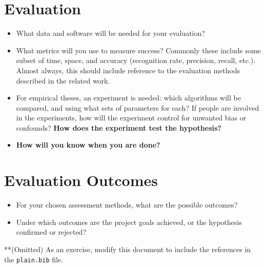 \documentclass[11pt]{artikel3}
\begin{document}
\section{Evaluation}







\begin{itemize}
\item What data and software will be needed for your evaluation? 
\item What metrics
will you use to measure success? Commonly these include some subset of time, space, and accuracy (recognition rate, precision, recall, etc.).
Almost always, this should include reference to the evaluation methods described in the related work.
\item For empirical theses, an experiment is needed: which algorithms will be compared, and using what sets of parameters for each? If people are involved in the experiments, how will the experiment control for unwanted bias or confounds? {\bf How does the experiment test the hypothesis?}
\item {\bf How will you know when you are done?}
\end{itemize}








\section{Evaluation Outcomes}








\begin{itemize}
\item For your chosen assessment methods, what are the possible outcomes? 
\item Under which outcomes are the project goals achieved, or the hypothesis confirmed or rejected?
\end{itemize}


















**(Omitted) As an exercise, modify this document to include the references in the {\tt plain.bib} file.
\end{document}
